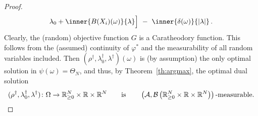 \begin{proof}
\begin{align*}
\lambda_0
+
\inner
{B(X_i)(\omega)}
{
\lambda
}
\Big]
  \ 
-
\ 
\inner
{\delta(\omega)}
{
  |\lambda|
}
\,.
  \end{align*}
  Clearly, the (random) objective function $G$  is a Caratheodory function. This follows from the (assumed) continuity of $\varphi^*$ and the measurability 
  of all random variables included.
  Then
  $(\rho^\dagger,\lambda_0^\dagger,\lambda^\dagger)(\omega)$ 
  is (by assumption) the only optimal solution in $\psi(\omega)=\Theta_N$, and thus, by Theorem~\ref{th:argmax},
  the optimal dual solution 
  \begin{align*}
  (\rho^\dagger,\lambda_0^\dagger,\lambda^\dagger)
  \colon
  \Omega\to 
  \mathbb{R}^N_{\ge 0}
  \times
  \mathbb{R}
  \times
  \mathbb{R}^{N}
  \qquad
  \text{is}
  \qquad
  \left(
  \mathcal{A},\mathcal{B}
  \left(
  \mathbb{R}^N_{\ge 0}
  \times
  \mathbb{R}
  \times
  \mathbb{R}^{N}
  \right)
  \right)
  \text{-measurable.}
  \end{align*}
\end{proof}

